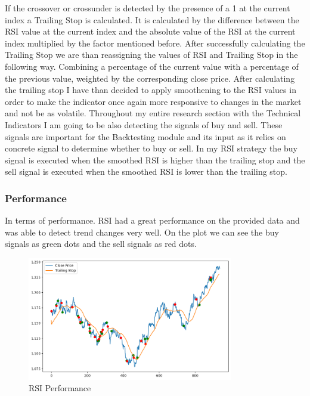 \documentclass{imc-inf}
\begin{document}
	If the crossover or crossunder is detected by the presence of a 1 at the current index a Trailing Stop is calculated. It is calculated by
	the difference between the RSI value at the current index and the absolute value of the RSI at the current index multiplied by the factor mentioned before.
	After successfully calculating the Trailing Stop we are than reassigning the values of RSI and Trailing Stop in the following way. Combining a 
	percentage of the current value with a percentage of the previous value, weighted by the corresponding close price.
	After calculating the trailing stop I have than decided to apply smoothening to the RSI values in order to make the indicator once again
	more responsive to changes in the market and not be as volatile.
	Throughout my entire research section with the Technical Indicators I am going to be also detecting the signals of buy and sell.
	These signals are important for the Backtesting module and its input as it relies on concrete signal to determine whether to buy or sell.
	In my RSI strategy the buy signal is executed when the smoothed RSI is higher than the trailing stop and the sell signal is executed when the
	smoothed RSI is lower than the trailing stop. 
	\subsubsection{Performance}
	
	In terms of performance. RSI had a great performance on the provided data and was able to detect trend changes very well. On the plot we can
	see the buy signals as green dots and the sell signals as red dots.
	\begin{figure}[h!]
		\centering
		\includegraphics[width=0.8\textwidth]{rsi_plot.png}
		\caption{RSI Performance}
		\label{fig:rsi_performance}	
	\end{figure}
	
\end{document}
